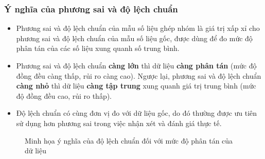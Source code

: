 \documentclass[12pt]{article}
\begin{document}
	\subsubsection{Ý nghĩa của phương sai và độ lệch chuẩn}
	\begin{itemize}
		\item Phương sai và độ lệch chuẩn của mẫu số liệu ghép nhóm là giá trị xấp xỉ cho phương sai và độ lệch chuẩn của mẫu số liệu gốc, được dùng để đo mức độ phân tán của các số liệu xung quanh số trung bình.
		\item Phương sai và độ lệch chuẩn \textbf{càng lớn} thì dữ liệu \textbf{càng phân tán} (mức độ đồng đều càng thấp, rủi ro càng cao). Ngược lại, phương sai và độ lệch chuẩn \textbf{càng nhỏ} thì dữ liệu \textbf{càng tập trung} xung quanh giá trị trung bình (mức độ đồng đều cao, rủi ro thấp).
		\item Độ lệch chuẩn có cùng đơn vị đo với dữ liệu gốc, do đó thường được ưu tiên sử dụng hơn phương sai trong việc nhận xét và đánh giá thực tế.
	\end{itemize}
	
	\begin{figure}[H]
		\centering
		\caption{Minh họa ý nghĩa của độ lệch chuẩn đối với mức độ phân tán của dữ liệu}
	\end{figure}
	
\end{document}
